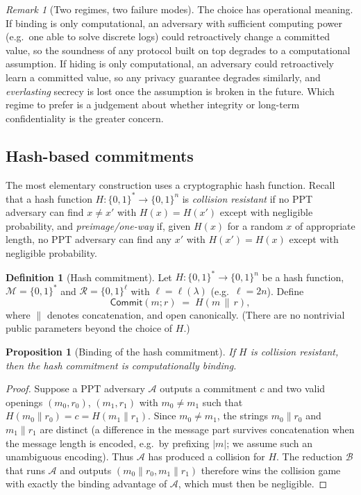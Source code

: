 \documentclass[11pt,a4paper]{article}
\newtheorem{proposition}[theorem]{Proposition}
\theoremstyle{definition}
\newtheorem{definition}[theorem]{Definition}
\theoremstyle{remark}
\newtheorem{remark}[theorem]{Remark}
\begin{document}
\begin{remark}[Two regimes, two failure modes]\label{commitments:rem:failure-modes}
The choice has operational meaning. If binding is only computational, an adversary with sufficient computing power (e.g.\ one able to solve discrete logs) could retroactively change a committed value, so the soundness of any protocol built on top degrades to a computational assumption. If hiding is only computational, an adversary could retroactively learn a committed value, so any privacy guarantee degrades similarly, and \emph{everlasting} secrecy is lost once the assumption is broken in the future. Which regime to prefer is a judgement about whether integrity or long-term confidentiality is the greater concern.
\end{remark}

\subsection{Hash-based commitments}\label{commitments:subsec:hash}

The most elementary construction uses a cryptographic hash function. Recall that a hash function \(H \colon \{0,1\}^* \to \{0,1\}^n\) is \emph{collision resistant} if no PPT adversary can find \(x \neq x'\) with \(H(x) = H(x')\) except with negligible probability, and \emph{preimage/one-way} if, given \(H(x)\) for a random \(x\) of appropriate length, no PPT adversary can find any \(x'\) with \(H(x') = H(x)\) except with negligible probability.

\begin{definition}[Hash commitment]\label{commitments:def:hash-commit}
Let \(H \colon \{0,1\}^* \to \{0,1\}^n\) be a hash function, \(\mathcal{M} = \{0,1\}^*\) and \(\mathcal{R} = \{0,1\}^\ell\) with \(\ell = \ell(\lambda)\) (e.g.\ \(\ell = 2n\)). Define
\[
  \mathsf{Commit}(m; r) \;=\; H(m \,\|\, r),
\]
where \(\|\) denotes concatenation, and open canonically. (There are no nontrivial public parameters beyond the choice of \(H\).)
\end{definition}

\begin{proposition}[Binding of the hash commitment]\label{commitments:prop:hash-binding}
If \(H\) is collision resistant, then the hash commitment is computationally binding.
\end{proposition}

\begin{proof}
Suppose a PPT adversary \(\mathcal{A}\) outputs a commitment \(c\) and two valid openings \((m_0, r_0)\), \((m_1, r_1)\) with \(m_0 \neq m_1\) such that \(H(m_0 \| r_0) = c = H(m_1 \| r_1)\). Since \(m_0 \neq m_1\), the strings \(m_0 \| r_0\) and \(m_1 \| r_1\) are distinct (a difference in the message part survives concatenation when the message length is encoded, e.g.\ by prefixing \(|m|\); we assume such an unambiguous encoding). Thus \(\mathcal{A}\) has produced a collision for \(H\). The reduction \(\mathcal{B}\) that runs \(\mathcal{A}\) and outputs \((m_0\|r_0, m_1\|r_1)\) therefore wins the collision game with exactly the binding advantage of \(\mathcal{A}\), which must then be negligible.
\end{proof}
\end{document}
